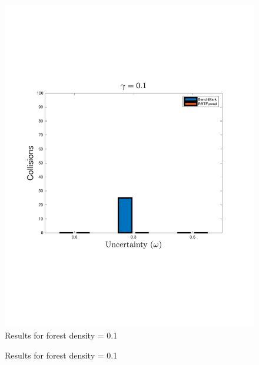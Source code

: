 \begin{figure}
  \centering
  \includegraphics[scale=.5]{figures/experiments/ResultPlot01}
  \caption{Results for forest density = 0.1}
  \label{fig:result0.1}
\end{figure}

\begin{figure}
  \centering
  \caption{Results for forest density = 0.1}
  \label{fig:result0.2}
\end{figure}
